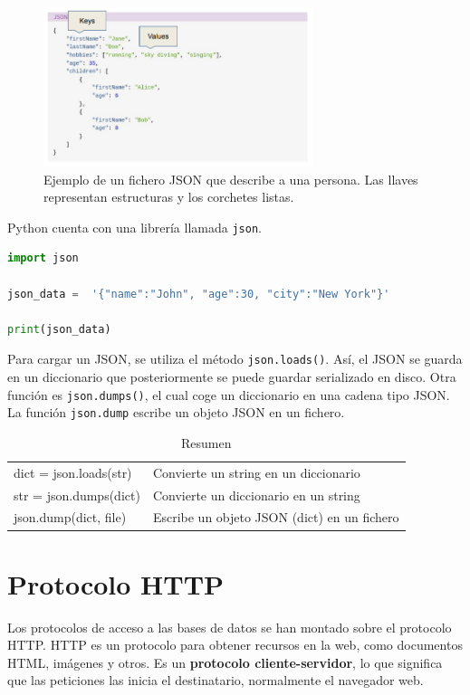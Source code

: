 \begin{figure}[htbp]
\centering
\includegraphics[width = 0.7\textwidth]{figs/json.png}
\caption{Ejemplo de un fichero JSON que describe a una persona. Las llaves representan estructuras y los corchetes listas.}
\label{fig:json}
\end{figure}

Python cuenta con una librería llamada \texttt{json}.
\begin{lstlisting}[language=Python]
import json

json_data =  '{"name":"John", "age":30, "city":"New York"}'

print(json_data)
\end{lstlisting}

Para cargar un JSON, se utiliza el método \texttt{json.loads()}. Así, el JSON se guarda en un diccionario que posteriormente se puede guardar serializado en disco. Otra función es \texttt{json.dumps()}, el cual coge un diccionario en una cadena tipo JSON. La función \texttt{json.dump} escribe un objeto JSON en un fichero. 

\begin{table}[htbp]
\centering
\begin{tabular}{l | l}
dict = json.loads(str) & Convierte un string en un diccionario \\
str = json.dumps(dict) & Convierte un diccionario en un string \\
json.dump(dict, file) & Escribe un objeto JSON (dict) en un fichero
\end{tabular}
\caption{Resumen}
\end{table}

\section{Protocolo HTTP}
Los protocolos de acceso a las bases de datos se han montado sobre el protocolo HTTP. HTTP es un protocolo para obtener recursos en la web, como documentos HTML, imágenes y otros. Es un \textbf{protocolo cliente-servidor}, lo que significa que las peticiones las inicia el destinatario, normalmente el navegador web. 

